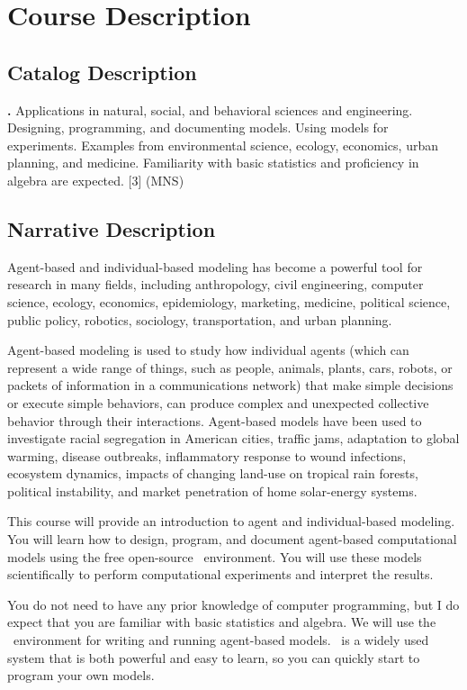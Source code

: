 \documentclass[11pt,twoside]{jgsyllabus}\usepackage[]{graphicx}\usepackage[]{xcolor}
\begin{document}
\medskip
\section[Description]{Course Description}
\subsection{Catalog Description}
\textbf{\ShortCourseName.} Applications in natural, social, and behavioral
sciences and engineering. Designing, programming, and documenting models.
Using models for experiments. Examples from environmental science, ecology,
economics, urban planning, and medicine. Familiarity with basic statistics and
proficiency in algebra are expected.
[3] (MNS)

\subsection{Narrative Description}
Agent-based and individual-based modeling has become a powerful tool for
research in many fields, including anthropology, civil engineering,
computer science, ecology, economics, epidemiology, marketing, medicine,
political science, public policy, robotics, sociology, transportation, and
urban planning.

Agent-based modeling is used to study how individual agents (which can represent
a wide range of things, such as people, animals, plants, cars, robots,
or packets of information in a communications network)
that make simple decisions or execute simple behaviors, can produce complex and
unexpected collective behavior through their interactions. Agent-based models
have been used to investigate racial segregation in American cities, traffic
jams, adaptation to global warming, disease outbreaks, inflammatory response to
wound infections, ecosystem dynamics, impacts of changing land-use on tropical
rain forests, political instability, and market penetration of home solar-energy
systems.

This course will provide an introduction to agent and individual-based modeling.
You will learn how to design, program, and document agent-based computational
models using the free open-source \NetLogo\ environment. You will use these
models scientifically to perform computational experiments and interpret the
results.

You do not need to have any prior knowledge of computer programming, but I do
expect that you are familiar with basic statistics and algebra.
We will use the \NetLogo\ environment for writing and running agent-based models.
\NetLogo\ is a widely used system that is both powerful and easy to learn, so
you can quickly start to program your own models.
\end{document}
